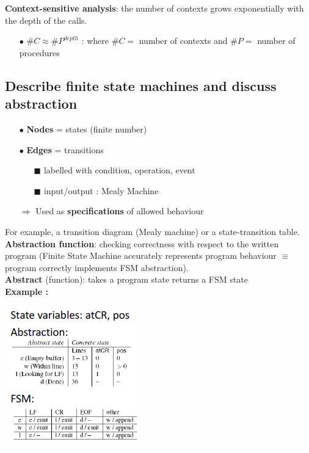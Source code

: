 \documentclass{article}
\begin{document}
\noindent\textbf{Context-sensitive analysis}:  the number of contexts grows exponentially with the depth of the calls.
\begin{itemize}
    \item [$\bullet$] $\#C \approx \#P^{depth}$   : where $\#C =$ number of contexts and $\#P =$ number of procedures

\end{itemize}

\newpage
\subsection{Describe finite state machines and discuss abstraction}

\begin{itemize}
    \item [$\bullet$]\textbf{Nodes} = states (finite number)
    \item [$\bullet$]\textbf{Edges} = transitions
    \begin{itemize}
        \item [$\blacksquare$]labelled with condition, operation, event
        \item [$\blacksquare$]input/output : Mealy Machine
    \end{itemize}
    \item[$\Rightarrow$]Used as \textbf{specifications} of allowed behaviour
\end{itemize}

\noindent For example, a transition diagram (Mealy machine) or a state-transition table.\\

\noindent\textbf{Abstraction function}: checking correctness with respect to the written program (Finite State Machine accurately represents program behaviour $\equiv$ program correctly implements FSM abstraction).\\
\textbf{Abstract} (function): takes a program state returns a FSM state\\

\noindent \textbf{Example : }
\begin{center}
    \includegraphics[scale = 0.7]{image/7.PNG}
\end{center}
\end{document}
